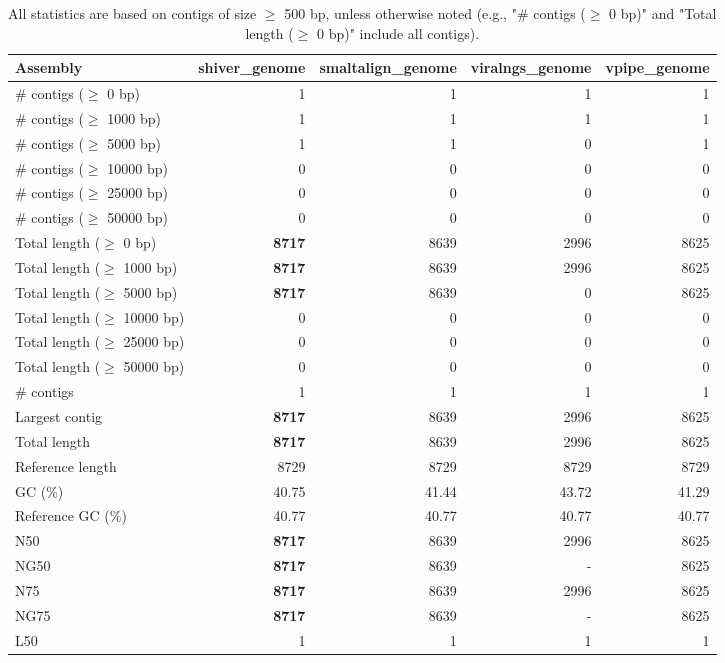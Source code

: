 \documentclass[12pt,a4paper]{article}
\begin{document}
\begin{table}[ht]
\begin{center}
\caption{All statistics are based on contigs of size $\geq$ 500 bp, unless otherwise noted (e.g., "\# contigs ($\geq$ 0 bp)" and "Total length ($\geq$ 0 bp)" include all contigs).}
\begin{tabular}{|l*{4}{|r}|}
\hline
Assembly & shiver\_genome & smaltalign\_genome & viralngs\_genome & vpipe\_genome \\ \hline
\# contigs ($\geq$ 0 bp) & 1 & 1 & 1 & 1 \\ \hline
\# contigs ($\geq$ 1000 bp) & 1 & 1 & 1 & 1 \\ \hline
\# contigs ($\geq$ 5000 bp) & 1 & 1 & 0 & 1 \\ \hline
\# contigs ($\geq$ 10000 bp) & 0 & 0 & 0 & 0 \\ \hline
\# contigs ($\geq$ 25000 bp) & 0 & 0 & 0 & 0 \\ \hline
\# contigs ($\geq$ 50000 bp) & 0 & 0 & 0 & 0 \\ \hline
Total length ($\geq$ 0 bp) & {\bf 8717} & 8639 & 2996 & 8625 \\ \hline
Total length ($\geq$ 1000 bp) & {\bf 8717} & 8639 & 2996 & 8625 \\ \hline
Total length ($\geq$ 5000 bp) & {\bf 8717} & 8639 & 0 & 8625 \\ \hline
Total length ($\geq$ 10000 bp) & 0 & 0 & 0 & 0 \\ \hline
Total length ($\geq$ 25000 bp) & 0 & 0 & 0 & 0 \\ \hline
Total length ($\geq$ 50000 bp) & 0 & 0 & 0 & 0 \\ \hline
\# contigs & 1 & 1 & 1 & 1 \\ \hline
Largest contig & {\bf 8717} & 8639 & 2996 & 8625 \\ \hline
Total length & {\bf 8717} & 8639 & 2996 & 8625 \\ \hline
Reference length & 8729 & 8729 & 8729 & 8729 \\ \hline
GC (\%) & 40.75 & 41.44 & 43.72 & 41.29 \\ \hline
Reference GC (\%) & 40.77 & 40.77 & 40.77 & 40.77 \\ \hline
N50 & {\bf 8717} & 8639 & 2996 & 8625 \\ \hline
NG50 & {\bf 8717} & 8639 & - & 8625 \\ \hline
N75 & {\bf 8717} & 8639 & 2996 & 8625 \\ \hline
NG75 & {\bf 8717} & 8639 & - & 8625 \\ \hline
L50 & 1 & 1 & 1 & 1 \\ \hline

\end{tabular}
\end{center}
\end{table}
\end{document}
